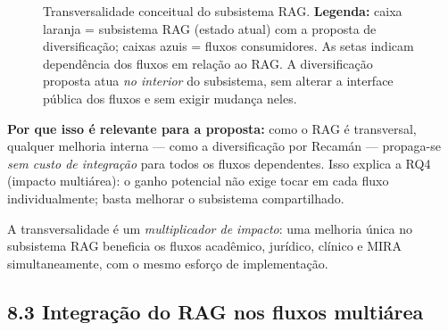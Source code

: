 \begin{figure}[!htb]
\centering
{}
\caption{Transversalidade conceitual do subsistema RAG. \textbf{Legenda:} caixa
laranja = subsistema RAG (estado atual) com a proposta de diversificação; caixas
azuis = fluxos consumidores. As setas indicam dependência dos fluxos em relação ao
RAG. A diversificação proposta atua \emph{no interior} do subsistema, sem alterar a
interface pública dos fluxos e sem exigir mudança neles.}
\label{fig:transversal}
\end{figure}

 \textbf{Por que isso é relevante para a proposta:} como o RAG é
transversal, qualquer melhoria interna --- como a diversificação por Recamán ---
propaga-se \emph{sem custo de integração} para todos os fluxos dependentes. Isso
explica a RQ4 (impacto multiárea): o ganho potencial não exige tocar em cada fluxo
individualmente; basta melhorar o subsistema compartilhado.

\begin{pontochave}
A transversalidade é um \emph{multiplicador de impacto}: uma melhoria única no
subsistema RAG beneficia os fluxos acadêmico, jurídico, clínico e MIRA
simultaneamente, com o mesmo esforço de implementação.
\end{pontochave}

\subsection*{8.3 Integração do RAG nos fluxos multiárea}

